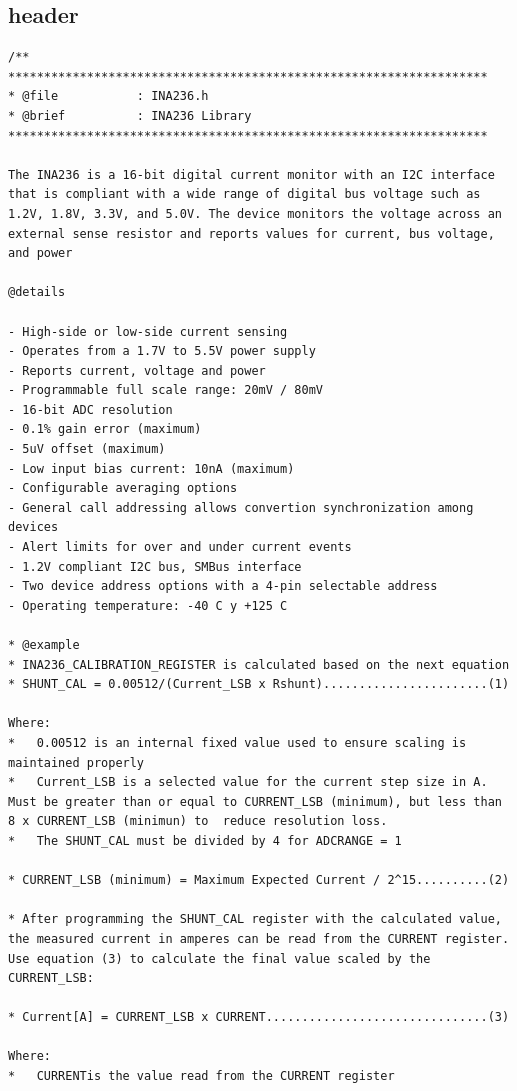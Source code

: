 \documentclass[
10pt, %
a4paper, %
oneside, %
headinclude,footinclude, %
BCOR5mm, %
]{scrartcl}
\begin{document}
\subsection{header}
\begin{lstlisting}[firstnumber=1,style=CStyle]
/**
*******************************************************************
* @file           : INA236.h
* @brief          : INA236 Library
*******************************************************************

The INA236 is a 16-bit digital current monitor with an I2C interface that is compliant with a wide range of digital bus voltage such as 1.2V, 1.8V, 3.3V, and 5.0V. The device monitors the voltage across an external sense resistor and reports values for current, bus voltage, and power

@details

- High-side or low-side current sensing 
- Operates from a 1.7V to 5.5V power supply
- Reports current, voltage and power
- Programmable full scale range: 20mV / 80mV
- 16-bit ADC resolution
- 0.1% gain error (maximum)
- 5uV offset (maximum)
- Low input bias current: 10nA (maximum)
- Configurable averaging options
- General call addressing allows convertion synchronization among devices
- Alert limits for over and under current events
- 1.2V compliant I2C bus, SMBus interface
- Two device address options with a 4-pin selectable address
- Operating temperature: -40 C y +125 C 
 
* @example
* INA236_CALIBRATION_REGISTER is calculated based on the next equation
* SHUNT_CAL = 0.00512/(Current_LSB x Rshunt).......................(1)

Where:
*   0.00512 is an internal fixed value used to ensure scaling is maintained properly
*   Current_LSB is a selected value for the current step size in A. Must be greater than or equal to CURRENT_LSB (minimum), but less than 8 x CURRENT_LSB (minimun) to  reduce resolution loss.
*   The SHUNT_CAL must be divided by 4 for ADCRANGE = 1
 
* CURRENT_LSB (minimum) = Maximum Expected Current / 2^15..........(2)
 
* After programming the SHUNT_CAL register with the calculated value, the measured current in amperes can be read from the CURRENT register. Use equation (3) to calculate the final value scaled by the CURRENT_LSB:
 
* Current[A] = CURRENT_LSB x CURRENT...............................(3)
  
Where:
*   CURRENTis the value read from the CURRENT register
 

\end{lstlisting}
\end{document}
